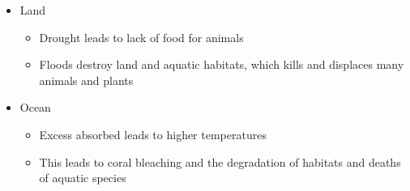 \documentclass[12pt]{article}
\begin{document}
\begin{enumerate}
\begin{itemize}
\begin{itemize}
        \end{itemize}

      \item Land

        \begin{itemize}

          \item Drought leads to lack of food for animals

          \item Floods destroy land and aquatic habitats, which kills and displaces many animals and plants

        \end{itemize}

      \item Ocean

        \begin{itemize}

          \item Excess  absorbed leads to higher temperatures

          \item This leads to coral bleaching and the degradation of habitats and deaths of aquatic species

        \end{itemize}

    \end{itemize}

\end{enumerate}
\end{document}
